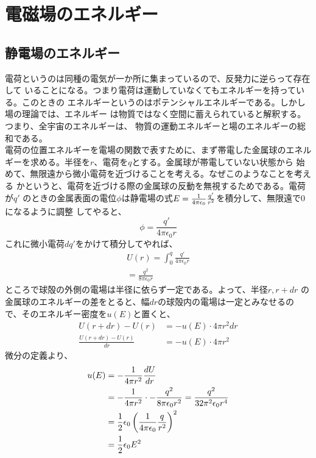     \section{電磁場のエネルギー}
        \subsection{静電場のエネルギー}
            電荷というのは同種の電気が一か所に集まっているので、反発力に逆らって存在して
            いることになる。つまり電荷は運動していなくてもエネルギーを持っている。このときの
            エネルギーというのはポテンシャルエネルギーである。しかし場の理論では、エネルギー
            は物質ではなく空間に蓄えられていると解釈する。つまり、全宇宙のエネルギーは、
            物質の運動エネルギーと場のエネルギーの総和である。\\
            電荷の位置エネルギーを電場の関数で表すために、まず帯電した金属球のエネル
            ギーを求める。半径を$r$、電荷を$q$とする。金属球が帯電していない状態から
            始めて、無限遠から微小電荷を近づけることを考える。なぜこのようなことを考える
            かというと、電荷を近づける際の金属球の反動を無視するためである。電荷が$q'$
            のときの金属表面の電位$\phi$は静電場の式$E = \rec
            {4\pi\epsilon_0}\frac{q'}{r^2}$を積分して、無限遠で0になるように調整
            してやると、
                \[\phi = \frac{q'}{4\pi\epsilon_0 r}\]
            これに微小電荷$dq'$をかけて積分してやれば、
            \begin{align*}
                U(r) = \int_0^q \frac{q'}{4\pi\epsilon_0 r}\\
                = \frac{q^2}{8\pi\epsilon_0 r}
            \end{align*}
            ところで球殻の外側の電場は半径に依らず一定である。よって、半径$r,r+dr$
            の金属球のエネルギーの差をとると、幅$dr$の球殻内の電場は一定とみなせるの
            で、そのエネルギー密度を$u(E)$と置くと、
            \begin{align*}
                U(r+dr)-U(r) &= -u(E)\cdot 4\pi r^2dr\\
                \frac{U(r+dr)-U(r)}{dr} &= -u(E)\cdot 4\pi r^2
            \end{align*}
            微分の定義より、
            \begin{align*}
                u(E) &= -\rec{4\pi r^2}\di[U]{r}\\
                &= -\rec{4\pi r^2}\cdot -\frac{q^2}{8\pi\epsilon_0 r^2}
                = \frac{q^2}{32\pi^2\epsilon_0 r^4}\\
                &= \rec{2}\epsilon_0\lr{\rec{4\pi\epsilon_0}\frac{q}{r^2}}^2\\
                &= \rec{2}\epsilon_0 E^2
            \end{align*}
